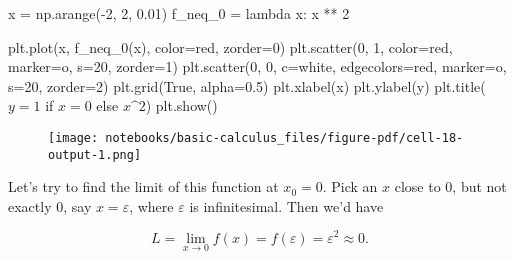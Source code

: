 \documentclass[
  letterpaper,
  DIV=11,
  numbers=noendperiod]{scrreprt}
\newenvironment{Shaded}{\begin{snugshade}}{\end{snugshade}}
\newcommand{\DecValTok}[1]{\textcolor[rgb]{0.68,0.00,0.00}{#1}}
\newcommand{\FloatTok}[1]{\textcolor[rgb]{0.68,0.00,0.00}{#1}}
\newcommand{\KeywordTok}[1]{\textcolor[rgb]{0.00,0.23,0.31}{#1}}
\newcommand{\NormalTok}[1]{\textcolor[rgb]{0.00,0.23,0.31}{#1}}
\newcommand{\OperatorTok}[1]{\textcolor[rgb]{0.37,0.37,0.37}{#1}}
\newcommand{\StringTok}[1]{\textcolor[rgb]{0.13,0.47,0.30}{#1}}
\newcommand{\VariableTok}[1]{\textcolor[rgb]{0.07,0.07,0.07}{#1}}
\begin{document}
\begin{Shaded}
\begin{Highlighting}[]
\NormalTok{x }\OperatorTok{=}\NormalTok{ np.arange(}\OperatorTok{{-}}\DecValTok{2}\NormalTok{, }\DecValTok{2}\NormalTok{, }\FloatTok{0.01}\NormalTok{)}
\NormalTok{f\_neq\_0 }\OperatorTok{=} \KeywordTok{lambda}\NormalTok{ x: x }\OperatorTok{**} \DecValTok{2}

\NormalTok{plt.plot(x, f\_neq\_0(x), color}\OperatorTok{=}\StringTok{\textquotesingle{}red\textquotesingle{}}\NormalTok{, zorder}\OperatorTok{=}\DecValTok{0}\NormalTok{)}
\NormalTok{plt.scatter(}\DecValTok{0}\NormalTok{, }\DecValTok{1}\NormalTok{, color}\OperatorTok{=}\StringTok{\textquotesingle{}red\textquotesingle{}}\NormalTok{, marker}\OperatorTok{=}\StringTok{\textquotesingle{}o\textquotesingle{}}\NormalTok{, s}\OperatorTok{=}\DecValTok{20}\NormalTok{, zorder}\OperatorTok{=}\DecValTok{1}\NormalTok{)}
\NormalTok{plt.scatter(}\DecValTok{0}\NormalTok{, }\DecValTok{0}\NormalTok{, c}\OperatorTok{=}\StringTok{\textquotesingle{}white\textquotesingle{}}\NormalTok{, edgecolors}\OperatorTok{=}\StringTok{\textquotesingle{}red\textquotesingle{}}\NormalTok{, marker}\OperatorTok{=}\StringTok{\textquotesingle{}o\textquotesingle{}}\NormalTok{, s}\OperatorTok{=}\DecValTok{20}\NormalTok{, zorder}\OperatorTok{=}\DecValTok{2}\NormalTok{)}
\NormalTok{plt.grid(}\VariableTok{True}\NormalTok{, alpha}\OperatorTok{=}\FloatTok{0.5}\NormalTok{)}
\NormalTok{plt.xlabel(}\StringTok{\textquotesingle{}x\textquotesingle{}}\NormalTok{)}
\NormalTok{plt.ylabel(}\StringTok{\textquotesingle{}y\textquotesingle{}}\NormalTok{)}
\NormalTok{plt.title(}\StringTok{\textquotesingle{}$y = 1$ if $x = 0$ else $x\^{}2$\textquotesingle{}}\NormalTok{)}
\NormalTok{plt.show()}
\end{Highlighting}
\end{Shaded}

\begin{figure}[H]

{\centering \texttt{[image: notebooks/basic-calculus\_files/figure-pdf/cell-18-output-1.png]}

}

\end{figure}

Let's try to find the limit of this function at \(x_0=0\). Pick an \(x\)
close to \(0\), but not exactly \(0\), say \(x=\varepsilon\), where
\(\varepsilon\) is infinitesimal. Then we'd have

\[L = \lim_{x \rightarrow 0} f(x) = f(\varepsilon) = \varepsilon^2 \approx 0.\]
\end{document}

